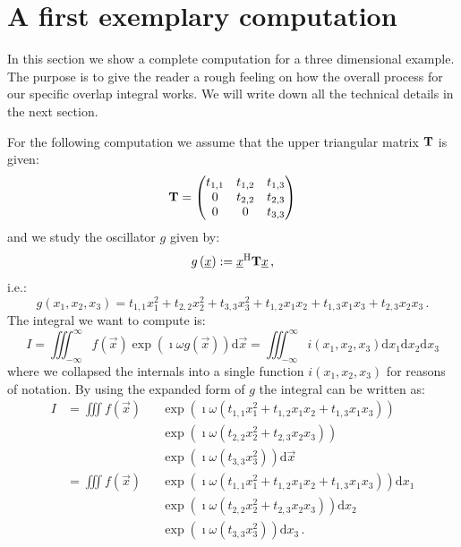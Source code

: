 \documentclass[a4paper,10pt]{article}
\begin{document}
\section{A first exemplary computation}
\label{sec:mv_triag_plain}


In this section we show a complete computation for a three
dimensional example. The purpose is to give the reader a
rough feeling on how the overall process for our specific
overlap integral works. We will write down all the technical
details in the next section.

For the following computation we assume that
the upper triangular matrix $\mathbf{T}$ is given:
\begin{equation}
 \mathbf{T} =
 \begin{pmatrix}
  t_{1,1} & t_{1,2} & t_{1,3} \\
  0       & t_{2,2} & t_{2,3} \\
  0       & 0       & t_{3,3}
 \end{pmatrix}
\end{equation}
and we study the oscillator $g$ given by:
\begin{equation}
 g\left(\underline{x}\right) := \underline{x}{}^{\textnormal{H}} \mathbf{T} \underline{x} \,,
\end{equation}
i.e.:
\begin{equation}
 g\left(x_1, x_2, x_3\right) = t_{1,1} x_1^2 + t_{2,2} x_2^2 + t_{3,3} x_3^2
                             + t_{1,2} x_1 x_2 + t_{1,3} x_1 x_3 + t_{2,3} x_2 x_3 \,.
\end{equation}
The integral we want to compute is:
\begin{equation}\label{eq:mv_original_integral}
  I = \iiint_{-\infty}^{\infty} f\left(\vec{x}\right) \exp\left(\imath \omega g\left(\vec{x}\right) \right) \mathrm{d}\vec{x}
    = \iiint_{-\infty}^{\infty} i\left(x_1, x_2, x_3\right) \mathrm{d}x_1 \mathrm{d}x_2 \mathrm{d}x_3
\end{equation}
where we collapsed the internals into a single function $i\left(x_1, x_2, x_3\right)$
for reasons of notation. By using the expanded form of $g$ the integral can be written as:
\begin{equation}
\begin{alignedat}{2}
 I & = \iiint f\left(\vec{x}\right)
             & & \exp\left(\imath \omega \left(t_{1,1} x_1^2 + t_{1,2} x_1 x_2 + t_{1,3} x_1 x_3\right) \right) \\
             & & & \exp\left(\imath \omega \left(t_{2,2} x_2^2 + t_{2,3} x_2 x_3\right) \right) \\
             & & & \exp\left(\imath \omega \left(t_{3,3} x_3^2 \right) \right)
       \mathrm{d}\vec{x} \\
   & = \iiint f\left(\vec{x}\right)
             & & \exp\left(\imath \omega \left(t_{1,1} x_1^2 + t_{1,2} x_1 x_2 + t_{1,3} x_1 x_3\right) \right)
            \mathrm{d}x_1 \\
             & & & \exp\left(\imath \omega \left(t_{2,2} x_2^2 + t_{2,3} x_2 x_3\right) \right)
            \mathrm{d}x_2 \\
             & & & \exp\left(\imath \omega \left(t_{3,3} x_3^2 \right) \right)
            \mathrm{d}x_3 \,.
\end{alignedat}
\end{equation}
\end{document}
